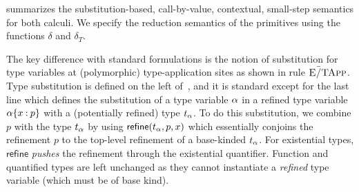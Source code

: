  summarizes the substitution-based, 
call-by-value, contextual, small-step semantics 
for both calculi.
%
We specify the reduction semantics 
of the primitives using the functions 
$\delta$ and $\delta_T$.

%
The key difference with standard formulations
is the notion of substitution for type variables 
at (polymorphic) type-application sites as shown 
in rule $\textsc{E\=/TApp}$.
%
Type 
substitution is defined on the left of~,
and it is standard except 
for the last line which defines the substitution 
of a type variable $\alpha$ in a refined type variable 
${{{\alpha}\{x \mathbin{:} p\}}}$ with a 
(potentially refined)
type $t_\alpha$.
%
To do this substitution, we combine $p$ with the type $t_\alpha$ 
by using $\mathsf{refine}(t_\alpha, p, x)$ 
which essentially conjoins the refinement $p$ 
to the top-level refinement of a base-kinded 
$t_\alpha$. 
%
For existential types, $\mathsf{refine}$ 
\emph{pushes} the refinement through the 
existential quantifier. 
%
Function and quantified types are left unchanged 
as they cannot instantiate a \emph{refined} 
type variable (which must be of base kind).



